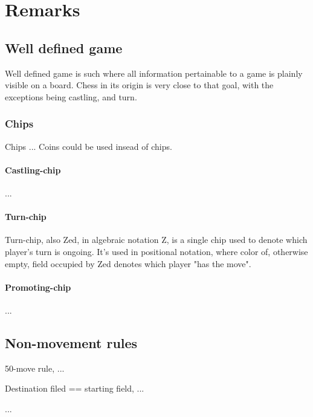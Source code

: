 

\chapter*{Remarks}
\label{ch:Remarks}

\section*{Well defined game}
\label{sec:Remarks/Well defined game}

Well defined game is such where all information pertainable to a game
is plainly visible on a board. Chess in its origin is very close to
that goal, with the exceptions being castling, and turn.

\subsection*{Chips}
\label{sec:Remarks/Chips}
Chips ...
Coins could be used insead of chips.

\subsubsection*{Castling-chip}
\label{sec:Remarks/Chips/Castling-chip}
...

\subsubsection*{Turn-chip}
\label{sec:Remarks/Chips/Turn-chip}
Turn-chip, also Zed, in algebraic notation Z, is a single chip used to
denote which player's turn is ongoing. It's used in positional notation,
where color of, otherwise empty, field occupied by Zed denotes which
player "has the move".

\subsubsection*{Promoting-chip}
\label{sec:Remarks/Chips/Promoting-chip}
...

\section*{Non-movement rules}
\label{sec:Remarks/Non-movement rules}

50-move rule, ...

Destination filed == starting field, ...

...

\clearpage %
